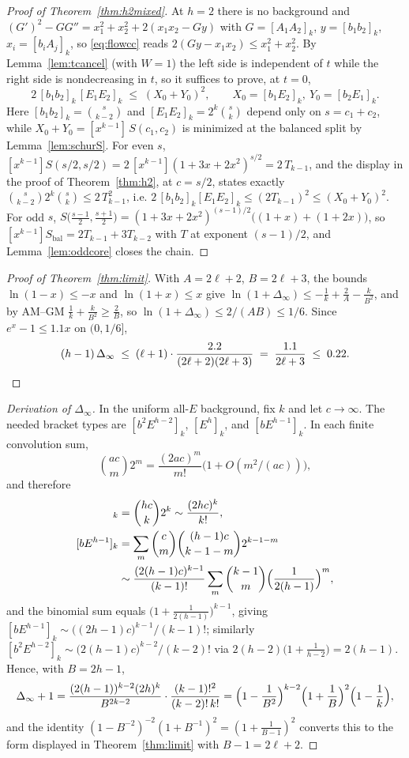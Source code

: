 \documentclass[11pt]{article}
\theoremstyle{definition}
\begin{document}
\begin{proof}[Proof of Theorem~\ref{thm:h2mixed}]
At $h=2$ there is no background and
$(G')^2-GG''=x_1^2+x_2^2+2(x_1x_2-Gy)$ with $G=[A_1A_2]_k$,
$y=[b_1b_2]_k$, $x_i=[b_iA_j]_k$, so \eqref{eq:flowcc} reads
$2(Gy-x_1x_2)\le x_1^2+x_2^2$.  By Lemma~\ref{lem:tcancel} (with
$W=1$) the left side is independent of $t$ while the right side is
nondecreasing in $t$, so it suffices to prove, at $t=0$,
\[
  2\,[b_1b_2]_k\,[E_1E_2]_k\;\le\;(X_0+Y_0)^2,
  \qquad X_0=[b_1E_2]_k,\ Y_0=[b_2E_1]_k .
\]
Here $[b_1b_2]_k=\binom s{k-2}$ and $[E_1E_2]_k=2^k\binom sk$ depend
only on $s=c_1+c_2$, while $X_0+Y_0=[x^{k-1}]\,S(c_1,c_2)$ is
minimized at the balanced split by Lemma~\ref{lem:schurS}.  For even
$s$,
$[x^{k-1}]S(s/2,s/2)=2\,[x^{k-1}](1+3x+2x^2)^{s/2}=2\,T_{k-1}$, and
the display in the proof of Theorem~\ref{thm:h2}, at $c=s/2$, states
exactly $\binom s{k-2}2^k\binom sk\le2\,T_{k-1}^2$, i.e.
$2\,[b_1b_2]_k[E_1E_2]_k\le(2T_{k-1})^2\le(X_0+Y_0)^2$.  For odd
$s$, $S\bigl(\tfrac{s-1}2,\tfrac{s+1}2\bigr)
=(1+3x+2x^2)^{(s-1)/2}\bigl((1+x)+(1+2x)\bigr)$, so
$[x^{k-1}]S_{\mathrm{bal}}=2T_{k-1}+3T_{k-2}$ with $T$ at exponent
$(s-1)/2$, and Lemma~\ref{lem:oddcore} closes the chain.
\end{proof}

\begin{proof}[Proof of Theorem~\ref{thm:limit}]
With $A=2\ell+2$, $B=2\ell+3$, the bounds $\ln(1-x)\le-x$ and
$\ln(1+x)\le x$ give
$\ln(1+\Delta_\infty)\le-\tfrac1k+\tfrac2A-\tfrac k{B^2}$, and by
AM--GM $\tfrac1k+\tfrac k{B^2}\ge\tfrac2B$, so
$\ln(1+\Delta_\infty)\le 2/(AB)\le 1/6$.  Since $e^x-1\le1.1x$ on
$(0,1/6]$,
\[
  (h-1)\,\Delta_\infty\;\le\;(\ell+1)\cdot\frac{2.2}{(2\ell+2)(2\ell+3)}
  \;=\;\frac{1.1}{2\ell+3}\;\le\;0.22 .\qedhere
\]
\end{proof}

\begin{proof}[Derivation of $\Delta_\infty$]
In the uniform all-$E$ background, fix $k$ and let $c\to\infty$.  The
needed bracket types are $[b^2E^{h-2}]_k$, $[E^h]_k$, and
$[bE^{h-1}]_k$.  In each finite convolution sum,
\[
  \binom{ac}m2^m=\frac{(2ac)^m}{m!}\bigl(1+O(m^2/(ac))\bigr),
\]
and therefore
\begin{align*}
  [E^h]_k
  &=\binom{hc}k2^k\sim\frac{(2hc)^k}{k!},\\
  [bE^{h-1}]_k
  &=\sum_m\binom cm\binom{(h-1)c}{k-1-m}2^{k-1-m}\\
  &\sim\frac{(2(h-1)c)^{k-1}}{(k-1)!}
  \sum_m\binom{k-1}m\Bigl(\frac1{2(h-1)}\Bigr)^m,
\end{align*}
and the binomial sum equals $\bigl(1+\tfrac1{2(h-1)}\bigr)^{k-1}$,
giving $[bE^{h-1}]_k\sim\bigl((2h-1)c\bigr)^{k-1}/(k-1)!$; similarly
$[b^2E^{h-2}]_k\sim\bigl(2(h-1)c\bigr)^{k-2}/(k-2)!$ via
$2(h-2)\bigl(1+\tfrac1{h-2}\bigr)=2(h-1)$.  Hence, with $B=2h-1$,
\[
  \Delta_\infty+1
  =\frac{(2(h-1))^{k-2}(2h)^k}{B^{2k-2}}\cdot\frac{(k-1)!^2}{(k-2)!\,k!}
  =\Bigl(1-\frac1{B^2}\Bigr)^{k-2}\Bigl(1+\frac1B\Bigr)^2
  \Bigl(1-\frac1k\Bigr),
\]
and the identity $(1-B^{-2})^{-2}(1+B^{-1})^2=(1+\tfrac1{B-1})^2$
converts this to the form displayed in Theorem~\ref{thm:limit} with
$B-1=2\ell+2$.
\end{proof}
\end{document}
